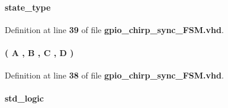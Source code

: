 \paragraph[{next\+\_\+state}]{ {\bfseries {\bfseries {\bf state\+\_\+type}} \textcolor{vhdlchar}{ }} \hspace{0.3cm}{\ttfamily [Signal]}}\label{classgpio__chirp__sync__FSM_1_1arch_a7b92f98d060e763f3dd6fa727ddb03d8}


Definition at line {\bf 39} of file {\bf gpio\+\_\+chirp\+\_\+sync\+\_\+\+F\+S\+M.\+vhd}.

\paragraph[{state\+\_\+type}]{ {\bfseries \textcolor{vhdlchar}{(}\textcolor{vhdlchar}{ }\textcolor{vhdlchar}{A}\textcolor{vhdlchar}{ }\textcolor{vhdlchar}{,}\textcolor{vhdlchar}{ }\textcolor{vhdlchar}{B}\textcolor{vhdlchar}{ }\textcolor{vhdlchar}{,}\textcolor{vhdlchar}{ }\textcolor{vhdlchar}{C}\textcolor{vhdlchar}{ }\textcolor{vhdlchar}{,}\textcolor{vhdlchar}{ }\textcolor{vhdlchar}{D}\textcolor{vhdlchar}{ }\textcolor{vhdlchar}{)}\textcolor{vhdlchar}{ }} \hspace{0.3cm}{\ttfamily [Type]}}\label{classgpio__chirp__sync__FSM_1_1arch_a8d5b4e16e4a38e00b3e2bb7f0ddeb150}


Definition at line {\bf 38} of file {\bf gpio\+\_\+chirp\+\_\+sync\+\_\+\+F\+S\+M.\+vhd}.

\paragraph[{trig\+\_\+sig}]{ {\bfseries \textcolor{comment}{std\+\_\+logic}\textcolor{vhdlchar}{ }} \hspace{0.3cm}{\ttfamily [Signal]}}\label{classgpio__chirp__sync__FSM_1_1arch_a116c94bab96431fc5828f4702c69a068}



